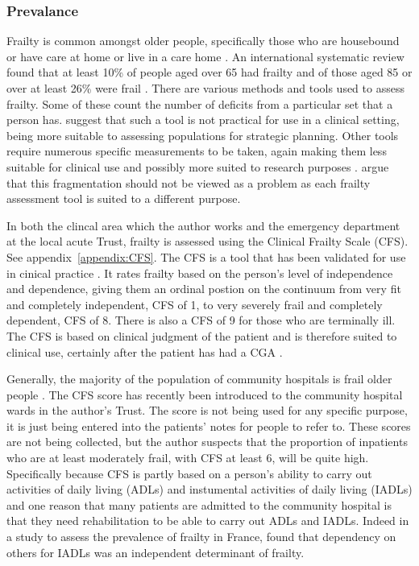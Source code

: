 \documentclass[12pt,a4paper,oneside,titlepage]{article}
\begin{document}
\subsubsection*{Prevalance}
Frailty is common amongst older people, specifically those who are housebound or 
have care at home or live in a care home \parencite{oliver:14}. An international systematic review found 
that at least 10\% of people aged over 65 had frailty and of those aged 85 or over
at least 26\% were frail \parencite{collard:12}. There are various methods and tools used to assess frailty.
Some of these count the number of deficits from a particular set that a person has. 
\textcite{sternberg:08} suggest that such a tool is not practical for use in a clinical
setting, being more suitable to assessing populations for strategic planning. 
Other tools require numerous specific measurements to be taken, again making them
less suitable for clinical use \parencite{martin:08} and possibly more suited to research purposes
\parencite{ensrud:08}. \textcite{romero-ortuno:16} argue that this fragmentation should not
be viewed as a problem as each frailty assessment tool is suited to a different 
purpose. 

In both the clincal area which the author works and the emergency department at
the local acute Trust, frailty is assessed using the Clinical Frailty Scale (CFS).
See appendix~\ref{appendix:CFS}.
The CFS is a tool that has been validated for use in cinical practice 
\parencite{rockwood:05}. It rates frailty based on the person's level of independence
and dependence, giving them an ordinal postion on the continuum from very fit and completely 
independent, CFS of 1, to very severely frail and completely dependent, CFS of 8.
There is also a CFS of 9 for those who are terminally ill. The CFS is based on clinical
judgment of the patient and is therefore suited to clinical use, certainly after
the patient has had a CGA \parencite{bgs:14}.

Generally, the majority of the population of community hospitals is frail older 
people \parencite{silver:12}.
The CFS score has recently been introduced to the community hospital wards in the author's Trust. The
score is not being used for any specific purpose, it is just being entered into 
the patients' notes for people to refer to. These scores are not being collected, 
but the author suspects that the proportion of inpatients who are at least 
moderately frail, with CFS at least 6, will be quite high. Specifically because
CFS is partly based on a person's ability to carry out activities of daily living (ADLs)
and instumental activities of daily living (IADLs) and one reason that many patients
are admitted to the community hospital is that they need rehabilitation to be
able to carry out ADLs and IADLs. Indeed in a study to assess the prevalence of frailty
in France, \textcite{cossec:16} found that dependency on others for IADLs was an 
independent determinant of frailty.
\end{document}
